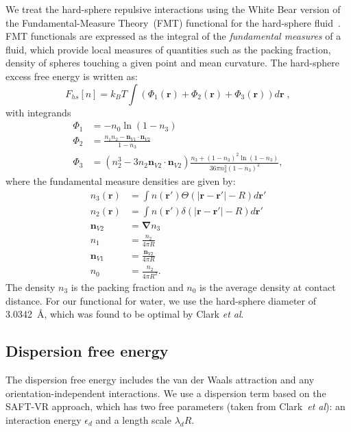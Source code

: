\documentclass[twocolumn,amsmath,amssymb,prl]{revtex4-1}
\newcommand{\xx}{\textbf{r}}
\newcommand\epsilondisp{\ensuremath{\epsilon_\textit{d}}}
\newcommand\lambdadisp{\ensuremath{\lambda_\textit{d}}}
\begin{document}
We treat the hard-sphere repulsive interactions using the White Bear version of
the Fundamental-Measure Theory~(FMT) functional for the hard-sphere
fluid~\cite{roth2002whitebear, yu2002structures}.  FMT functionals are expressed as the integral of
the \emph{fundamental measures} of a fluid, which provide local
measures of quantities such as the packing fraction, density of
spheres touching a given point and mean curvature.  The hard-sphere
excess free energy is written as:
\begin{equation}
F_{hs}[n] = k_B T \int (\Phi_1(\xx) + \Phi_2(\xx) + \Phi_3(\xx)) d\xx \; ,
\end{equation}
with integrands
\begin{align}
\Phi_1 &= -n_0 \ln\left( 1 - n_3\right)\\
\Phi_2 &= \frac{n_1 n_2 - \mathbf{n}_{V1} \cdot\mathbf{n}_{V2}}{1-n_3} \\
\Phi_3 &= (n_2^3 - 3n_2 \mathbf{n}_{V2} \cdot \mathbf{n}_{V2})
  \frac{
    n_3 + (1-n_3)^2\ln(1-n_3)
  }{
    36\pi n_3^2\left( 1 - n_3 \right)^2
  } ,
\end{align}
where the fundamental measure densities are given by:
\begin{align}
  n_3(\xx) &= \int n(\xx') \Theta(\left|\xx - \xx'\right| - R) d\xx' \\
  n_2(\xx) &= \int n(\xx') \delta(\left|\xx - \xx'\right| - R) d\xx'
  \\
  \mathbf{n}_{V2} &= \mathbf{\nabla} n_3 \\
  n_1 &= \frac{n_2}{4\pi R}\\
  \mathbf{n}_{V1} &= \frac{\mathbf{n}_{V2}}{4\pi R}\\
  n_0 &= \frac{n_2}{4\pi R^2}.
\end{align}
The density $n_3$ is the packing fraction and $n_0$ is the
average density at contact distance. For our functional for water, we
use the hard-sphere diameter of 3.0342~\AA, which was found to be
optimal by Clark \emph{et al}.\cite{clark2006developing}

\subsection{Dispersion free energy}
The dispersion free energy includes the van der Waals attraction and
any orientation-independent interactions. We use a dispersion term
based on the SAFT-VR approach\cite{gil-villegas-1997-SAFT-VR}, which
has two free parameters (taken from Clark~\emph{et
  al}\cite{clark2006developing}): an interaction energy $\epsilondisp$
and a length scale $\lambdadisp R$.
\end{document}
